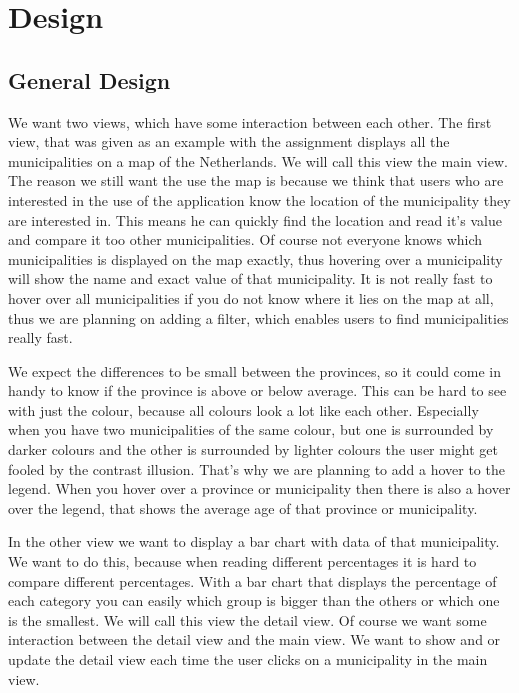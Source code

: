 \section{Design}\label{Sec:Des}
	\subsection{General Design}
		We want two views, which have some interaction between each other.
		The first view, that was given as an example with the assignment displays all the municipalities on a map of the Netherlands.
		We will call this view the main view.
		The reason we still want the use the map is because we think that users who are interested in the use of the application know the location of the municipality they are interested in.
		This means he can quickly find the location and read it's value and compare it too other municipalities.
		Of course not everyone knows which municipalities is displayed on the map exactly, thus hovering over a municipality will show the name and exact value of that municipality.
		It is not really fast to hover over all municipalities if you do not know where it lies on the map at all, thus we are planning on adding a filter, which enables users to find municipalities really fast.

		We expect the differences to be small between the provinces, so it could come in handy to know if the province is above or below average.
		This can be hard to see with just the colour, because all colours look a lot like each other.
		Especially when you have two municipalities of the same colour, but one is surrounded by darker colours and the other is surrounded by lighter colours the user might get fooled by the contrast illusion.
		That's why we are planning to add a hover to the legend.
		When you hover over a province or municipality then there is also a hover over the legend, that shows the average age of that province or municipality.

		In the other view we want to display a bar chart with data of that municipality.
		We want to do this, because when reading different percentages it is hard to compare different percentages.
		With a bar chart that displays the percentage of each category you can easily which group is bigger than the others or which one is the smallest.
		We will call this view the detail view.
		Of course we want some interaction between the detail view and the main view.
		We want to show and or update the detail view each time the user clicks on a municipality in the main view.

